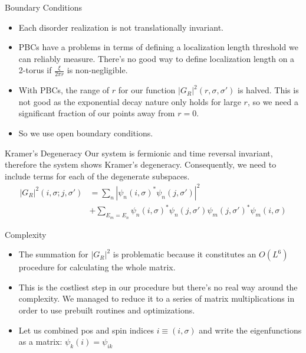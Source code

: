 \documentclass[]{beamer}
\begin{document}
\begin{frame}{Boundary Conditions}
    \begin{itemize}
        \item Each disorder realization is not
        translationally invariant.
        \item PBCs have a problems in terms of defining a
        localization length threshold we can reliably
        measure. There's no good way to define localization
        length on a 2-torus if $\frac{\xi}{2\pi r}$ is
        non-negligible.
        \item With PBCs, the range of $r$ for our function
        $|G_R|^2(r,\sigma,\sigma')$ is halved. This is not
        good as the exponential decay nature only holds for
        large $r$, so we need a significant fraction of our
        points away from $r = 0$.
        \item So we use open boundary conditions.
    \end{itemize}
\end{frame}

\begin{frame}{Kramer's Degeneracy}
    Our system is fermionic and time reversal invariant, therefore
    the system shows Kramer's degeneracy. Consequently, we need to include terms
    for each of the degenerate subspaces.
    \begin{align*}
        |G_R|^2(i,\sigma;j,\sigma') &= \sum_n |\psi_n(i,\sigma)^* \psi_n(j,\sigma')|^2\\
        &+ \sum_{E_m = E_n} \psi_n(i,\sigma)^*\psi_n(j,\sigma')\psi_m(j,\sigma')^*\psi_m(i,\sigma)
    \end{align*}
\end{frame}

\begin{frame}{Complexity}
    \begin{itemize}
        \item The summation for $|G_R|^2$ is problematic
        because it constitutes an $O(L^6)$ procedure for
        calculating the whole matrix.
        \item This is the costliest step in our procedure
        but there's no real way around the complexity. We
        managed to reduce it to a series of matrix
        multiplications in order to use prebuilt routines
        and optimizations.
        \item Let us combined pos and spin indices
        $i\equiv(i,\sigma)$ and write the eigenfunctions as
        a matrix: $\psi_k(i) = \psi_{ik}$
    \end{itemize}
\end{frame}
\end{document}
